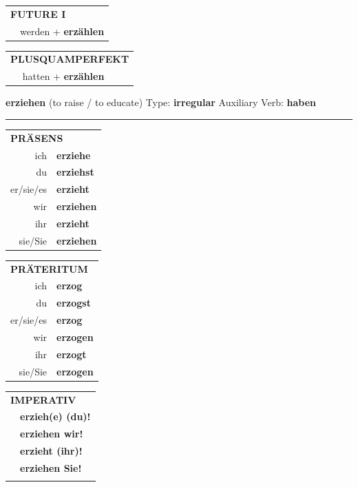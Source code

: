 \documentclass[10pt,a4paper]{revtex4-2}
\begin{document}
\begin{verbbox-dat}
\begin{tabular}{rl}
    \multicolumn{2}{l}{\textbf{FUTURE I} }\\
  &  werden + \textbf{erzählen}\\
 
  \end{tabular}
\hfill
   \begin{tabular}{rl}
      \multicolumn{2}{l}{\textbf{PLUSQUAMPERFEKT}}\\
   & hatten + \textbf{erzählen}\\
  \end{tabular}
  
  \vspace{-5pt}


\end{verbbox-dat}

\begin{verbbox}
    {\Large \bf erziehen} (to raise / to educate) \hfill Type: \textbf{irregular} \hfill Auxiliary Verb: \textbf{haben} 
    
     \vspace{5pt}

    \hrule
    
    \vspace{5pt}

  \begin{tabular}{rl}
     \multicolumn{2}{l}{\textbf{PRÄSENS} }\\
    ich & \textbf{erziehe}\\
    du & \textbf{erziehst}\\
    er/sie/es & \textbf{erzieht}\\
    wir & \textbf{erziehen}\\
    ihr & \textbf{erzieht}\\
    sie/Sie & \textbf{erziehen}\\
  \end{tabular}
  \hfill
     \begin{tabular}{rl}
    \multicolumn{2}{l}{\textbf{PRÄTERITUM} }\\
    ich & \textbf{erzog}\\
    du & \textbf{erzogst}\\
    er/sie/es & \textbf{erzog}\\
    wir & \textbf{erzogen}\\
    ihr & \textbf{erzogt}\\
    sie/Sie & \textbf{erzogen}\\
  \end{tabular}
  \hfill
  \begin{tabular}{rl}
     \multicolumn{2}{l}{\textbf{IMPERATIV} }\\
   & \textbf{erzieh(e) (du)!}\\
   & \textbf{erziehen wir!}\\
   & \textbf{erzieht (ihr)!}\\
   & \textbf{erziehen Sie!}\\
   & \vspace{10pt}
  \end{tabular}


\end{verbbox}
\end{document}
